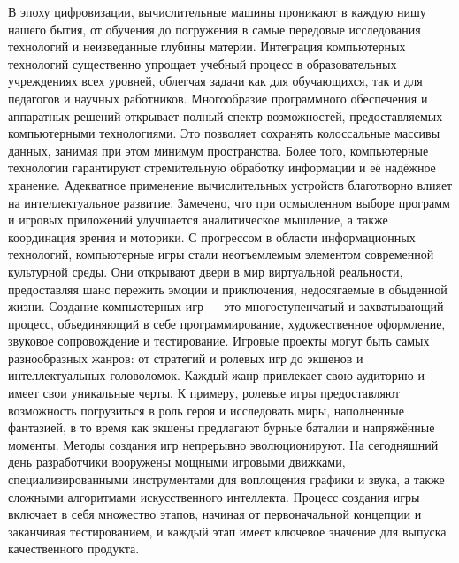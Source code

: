 В эпоху цифровизации, вычислительные машины проникают в каждую нишу нашего бытия, от обучения до погружения в самые передовые исследования технологий и неизведанные глубины материи. Интеграция компьютерных технологий существенно упрощает учебный процесс в образовательных учреждениях всех уровней, облегчая задачи как для обучающихся, так и для педагогов и научных работников.
Многообразие программного обеспечения и аппаратных решений открывает полный спектр возможностей, предоставляемых компьютерными технологиями. Это позволяет сохранять колоссальные массивы данных, занимая при этом минимум пространства. Более того, компьютерные технологии гарантируют стремительную обработку информации и её надёжное хранение. Адекватное применение вычислительных устройств благотворно влияет на интеллектуальное развитие. Замечено, что при осмысленном выборе программ и игровых приложений улучшается аналитическое мышление, а также координация зрения и моторики.
С прогрессом в области информационных технологий, компьютерные игры стали неотъемлемым элементом современной культурной среды. Они открывают двери в мир виртуальной реальности, предоставляя шанс пережить эмоции и приключения, недосягаемые в обыденной жизни. Создание компьютерных игр — это многоступенчатый и захватывающий процесс, объединяющий в себе программирование, художественное оформление, звуковое сопровождение и тестирование. Игровые проекты могут быть самых разнообразных жанров: от стратегий и ролевых игр до экшенов и интеллектуальных головоломок. Каждый жанр привлекает свою аудиторию и имеет свои уникальные черты. К примеру, ролевые игры предоставляют возможность погрузиться в роль героя и исследовать миры, наполненные фантазией, в то время как экшены предлагают бурные баталии и напряжённые моменты. Методы создания игр непрерывно эволюционируют. На сегодняшний день разработчики вооружены мощными игровыми движками, специализированными инструментами для воплощения графики и звука, а также сложными алгоритмами искусственного интеллекта. Процесс создания игры включает в себя множество этапов, начиная от первоначальной концепции и заканчивая тестированием, и каждый этап имеет ключевое значение для выпуска качественного продукта.